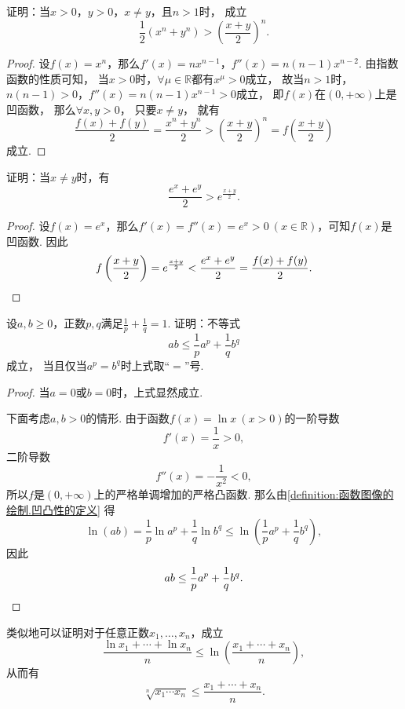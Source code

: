 \begin{example}
证明：当\(x>0\)，\(y>0\)，\(x \neq y\)，且\(n>1\)时，
成立\begin{equation}\label{equation:微分中值定理.平均数的比较1}
	\frac{1}{2} (x^n+y^n) > \left(\frac{x+y}{2}\right)^n.
\end{equation}
\begin{proof}
设\(f(x) = x^n\)，那么\(f'(x) = n x^{n-1}\)，\(f''(x) = n(n-1) x^{n-2}\).
由指数函数的性质可知，
当\(x > 0\)时，\(\forall \mu \in \mathbb{R}\)都有\(x^{\mu} > 0\)成立，
故当\(n > 1\)时，\(n(n-1)>0\)，\(f''(x) = n(n-1) x^{n-1} > 0\)成立，
即\(f(x)\)在\((0,+\infty)\)上是凹函数，
那么\(\forall x,y>0\)，
只要\(x \neq y\)，
就有\[
	\frac{f(x)+f(y)}{2} = \frac{x^n+y^n}{2}
	> \left(\frac{x+y}{2}\right)^n = f\left(\frac{x+y}{2}\right)
\]成立.
\end{proof}
\end{example}

\begin{example}
证明：当\(x \neq y\)时，有\begin{equation}
	\frac{e^x + e^y}{2} > e^{\frac{x+y}{2}}.
\end{equation}
\begin{proof}
设\(f(x) = e^x\)，那么\(f'(x) = f''(x) = e^x > 0\ (x\in\mathbb{R})\)，可知\(f(x)\)是凹函数.
因此\[
	f\left(\frac{x+y}{2}\right) = e^{\frac{x+y}{2}}
	< \frac{e^x+e^y}{2} = \frac{f(x)+f(y)}{2}.
	\qedhere
\]
\end{proof}
\end{example}

\begin{example}[杨格不等式]\label{example:函数图像的绘制.杨格不等式}
设\(a,b\geq0\)，正数\(p,q\)满足\(\frac1p+\frac1q=1\).
证明：不等式\[
	a b \leq \frac1p a^p + \frac1q b^q
\]成立，
当且仅当\(a^p = b^q\)时上式取“\(=\)”号.
\begin{proof}
当\(a=0\)或\(b=0\)时，上式显然成立.

下面考虑\(a,b>0\)的情形.
由于函数\(f(x) = \ln x\ (x>0)\)的一阶导数\[
	f'(x) = \frac1x > 0,
\]
二阶导数\[
	f''(x) = -\frac1{x^2} < 0,
\]
所以\(f\)是\((0,+\infty)\)上的严格单调增加的严格凸函数.
那么由\cref{definition:函数图像的绘制.凹凸性的定义} 得\[
	\ln(ab) = \frac1p \ln a^p + \frac1q \ln b^q
	\leq \ln\left( \frac1p a^p + \frac1q b^q \right),
\]
因此\[
	ab \leq \frac1p a^p + \frac1q b^q.
	\qedhere
\]
\end{proof}
\end{example}
\begin{remark}
类似地可以证明对于任意正数\(x_1,\dotsc,x_n\)，成立\[
	\frac{\ln x_1 + \dotsb + \ln x_n}{n}
	\leq \ln\left( \frac{x_1 + \dotsb + x_n}{n} \right),
\]
从而有\[
	\sqrt[n]{x_1 \dotsm x_n}
	\leq \frac{x_1 + \dotsb + x_n}{n}.
\]
\end{remark}

